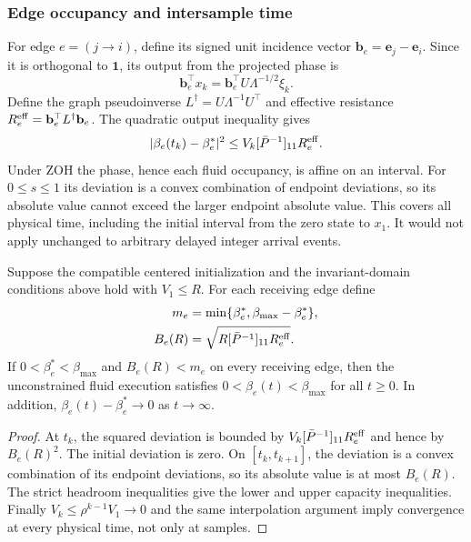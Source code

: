\subsubsection{Edge occupancy and intersample time}
For edge $e=(j\to i)$, define its signed unit incidence vector
$\mathbf b_e=\mathbf e_j-\mathbf e_i$. Since it is orthogonal to
$\mathbf1$, its output from the projected phase is
\[
 \mathbf b_e^\top x_k=\mathbf b_e^\top U\Lambda^{-1/2}\xi_k.
\]
Define the graph pseudoinverse $L^\dagger=U\Lambda^{-1}U^\top$ and
effective resistance $R_e^{\rm eff}=\mathbf b_e^\top L^\dagger\mathbf b_e$.
The quadratic output inequality gives
\begin{equation}
 |\beta_e(t_k)-\beta_e^*|^2
 \le V_k[\bar P^{-1}]_{11}R_e^{\rm eff}.
 \label{detail:eq:btd_edge_bound}
\end{equation}
Under ZOH the phase, hence each fluid occupancy, is affine on an interval.
For $0\le s\le1$ its deviation is a convex combination of endpoint
deviations, so its absolute value cannot exceed the larger endpoint
absolute value. This covers all physical time, including the initial
interval from the zero state to $x_1$. It would not apply unchanged to
arbitrary delayed integer arrival events.

\begin{btdcorollary}
\label{detail:cor:btd_buffer_safety}
Suppose the compatible centered initialization and the invariant-domain
conditions above hold with $V_1\le R$. For each receiving edge define
\begin{align}
 m_e&=\min\{\beta_e^*,\beta_{\max}-\beta_e^*\},\nonumber\\
 B_e(R)&=\sqrt{R[\bar P^{-1}]_{11}R_e^{\rm eff}}.
 \label{detail:eq:btd_buffer_headroom_condition}
\end{align}
If $0<\beta_e^*<\beta_{\max}$ and $B_e(R)<m_e$ on every receiving edge,
then the unconstrained fluid execution satisfies
$0<\beta_e(t)<\beta_{\max}$ for all $t\ge0$. In addition,
$\beta_e(t)-\beta_e^*\to0$ as $t\to\infty$.
\end{btdcorollary}
\begin{proof}
At $t_k$, the squared deviation is bounded by
$V_k[\bar P^{-1}]_{11}R_e^{\rm eff}$ and hence by $B_e(R)^2$.
The initial deviation is zero. On $[t_k,t_{k+1}]$, the deviation is a
convex combination of its endpoint deviations, so its absolute value
is at most $B_e(R)$. The strict headroom inequalities give the lower
and upper capacity inequalities. Finally $V_k\le\rho^{k-1}V_1\to0$
and the same interpolation argument imply convergence at every
physical time, not only at samples.
\end{proof}

